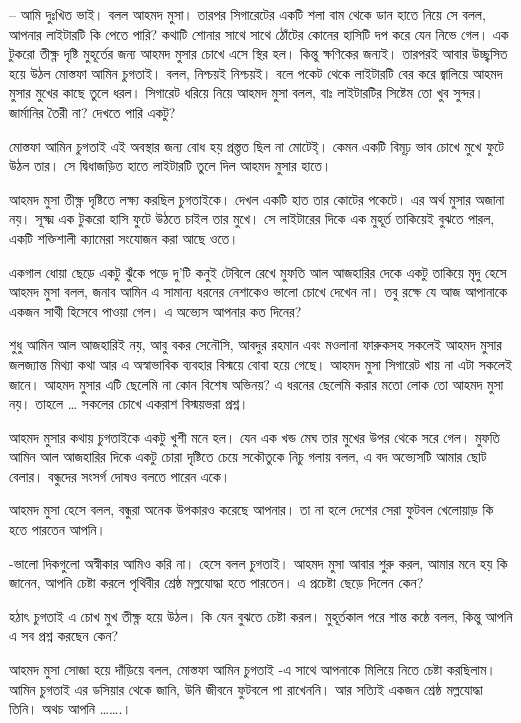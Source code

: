 \documentclass[
]{book}
\begin{document}
-- আমি দুঃখিত ভাই। বলল আহমদ মুসা। তারপর সিগারেটের একটি শলা বাম থেকে ডান হাতে নিয়ে সে বলল, আপনার লাইটারটি কি পেতে পারি? কথাটি শোনার সাথে সাথে ঠোঁটের কোনের হাসিটি দপ করে যেন নিভে গেল। এক টুকরো তীক্ষ্ণ দৃষ্টি মুহূর্তের জন্য আহমদ মুসার চোখে এসে স্থির হল। কিন্তু ক্ষণিকের জন্যই। তারপরই আবার উচ্ছ্বসিত হয়ে উঠল মোস্তফা আমিন চুগতাই। বলল, নিশ্চয়ই নিশ্চয়ই। বলে পকেট থেকে লাইটারটি বের করে জ্বালিয়ে আহমদ মুসার মুখের কাছে তুলে ধরল। সিগারেট ধরিয়ে নিয়ে আহমদ মুসা বলল, বাঃ লাইটারটির সিষ্টেম তো খুব সুন্দর। জার্মানির তৈরী না? দেখতে পারি একটু?

মোস্তফা আমিন চুগতাই এই অবস্থার জন্য বোধ হয় প্রস্ত্তত ছিল না মোটেই্। কেমন একটি বিমূঢ় ভাব চোখে মুখে ফুটে উঠল তার। সে দ্বিধাজড়িত হাতে লাইটারটি তুলে দিল আহমদ মুসার হাতে।

আহমদ মুসা তীক্ষ্ণ দৃষ্টিতে লক্ষ্য করছিল চুগতাইকে। দেখল একটি হাত তার কোটের পকেটে। এর অর্থ মুসার অজানা নয়। সূক্ষ্ম এক টুকরো হাসি ফুটে উঠতে চাইল তার মুখে। সে লাইটারের দিকে এক মুহূর্ত তাকিয়েই বুঝতে পারল, একটি শক্তিশালী ক্যামেরা সংযোজন করা আছে ওতে।

একগাল ধোয়া ছেড়ে একটু ঝুঁকে পড়ে দু'টি কনুই টেবিলে রেখে মুফতি আল আজহারির দেকে একটু তাকিয়ে মৃদু হেসে আহমদ মুসা বলল, জনাব আমিন এ সামান্য ধরনের নেশাকেও ভালো চোখে দেখেন না। তবু রক্ষে যে আজ আপানাকে একজন সাথী হিসেবে পাওয়া গেল। এ অভ্যেস আপনার কত দিনের?

শুধু আমিন আল আজহারিই নয়, আবু বকর সেনৌসি, আবদুর রহমান এবং মওলানা ফারুকসহ সকলেই আহমদ মুসার জলজ্যান্ত মিথ্যা কথা আর এ অস্বাভাবিক ব্যবহার বিস্ময়ে বোবা হয়ে গেছে। আহমদ মুসা সিগারেট খায় না এটা সকলেই জানে। আহমদ মুসার এটি ছেলেমি না কোন বিশেষ অভিনয়? এ ধরনের ছেলেমি করার মতো লোক তো আহমদ মুসা নয়। তাহলে \ldots{} সকলের চোখে একরাশ বিস্ময়ভরা প্রশ্ন।

আহমদ মুসার কথায় চুগতাইকে একটু খুশী মনে হল। যেন এক খন্ড মেঘ তার মুখের উপর থেকে সরে গেল। মুফতি আমিন আল আজহারির দিকে একটু চোরা দৃষ্টিতে চেয়ে সকৌতুকে নিচু গলায় বলল, এ বদ অভ্যেসটি আমার ছোট বেলার। বন্ধুদের সংসর্গ দোষও বলতে পারেন একে।

আহমদ মুসা হেসে বলল, বন্ধুরা অনেক উপকারও করেছে আপনার। তা না হলে দেশের সেরা ফুটবল খেলোয়াড় কি হতে পারতেন আপনি।

-ভালো দিকগুলো অস্বীকার আমিও করি না। হেসে বলল চুগতাই। আহমদ মুসা আবার শুরু করল, আমার মনে হয় কি জানেন, আপনি চেষ্টা করলে পৃথিবীর শ্রেষ্ঠ মল্লযোদ্ধা হতে পারতেন। এ প্রচেষ্টা ছেড়ে দিলেন কেন?

হঠাৎ চুগতাই এ চোখ মুখ তীক্ষ্ণ হয়ে উঠল। কি যেন বুঝতে চেষ্টা করল। মুহূর্তকাল পরে শান্ত কন্ঠে বলল, কিন্তু আপনি এ সব প্রশ্ন করছেন কেন?

আহমদ মুসা সোজা হয়ে দাঁড়িয়ে বলল, মোস্তফা আমিন চুগতাই -এ সাথে আপনাকে মিলিয়ে নিতে চেষ্টা করছিলাম। আমিন চুগতাই এর ডসিয়ার থেকে জানি, উনি জীবনে ফুটবলে পা রাখেননি। আর সত্যিই একজন শ্রেষ্ঠ মল্লযোদ্ধা তিনি। অথচ আপনি \ldots\ldots.।
\end{document}
